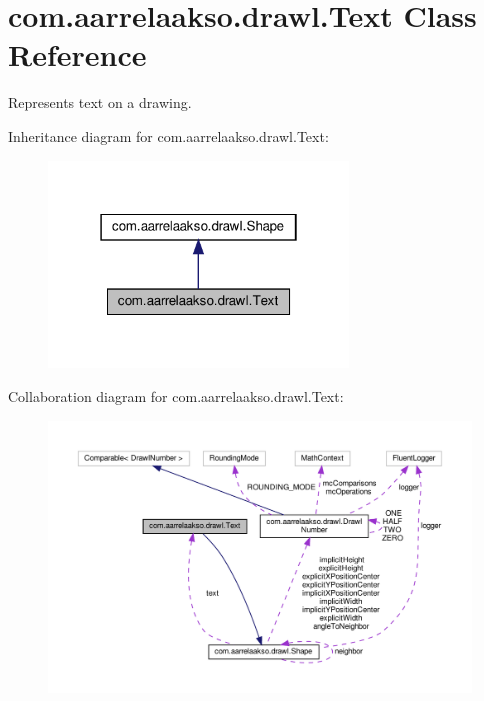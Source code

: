 \hypertarget{classcom_1_1aarrelaakso_1_1drawl_1_1_text}{}\section{com.\+aarrelaakso.\+drawl.\+Text Class Reference}
\label{classcom_1_1aarrelaakso_1_1drawl_1_1_text}


Represents text on a drawing.  




Inheritance diagram for com.\+aarrelaakso.\+drawl.\+Text\+:
\nopagebreak
\begin{figure}[H]
\begin{center}
\leavevmode
\includegraphics[width=226pt]{dd/dcf/classcom_1_1aarrelaakso_1_1drawl_1_1_text__inherit__graph}
\end{center}
\end{figure}


Collaboration diagram for com.\+aarrelaakso.\+drawl.\+Text\+:
\nopagebreak
\begin{figure}[H]
\begin{center}
\leavevmode
\includegraphics[width=350pt]{df/d69/classcom_1_1aarrelaakso_1_1drawl_1_1_text__coll__graph}
\end{center}
\end{figure}
